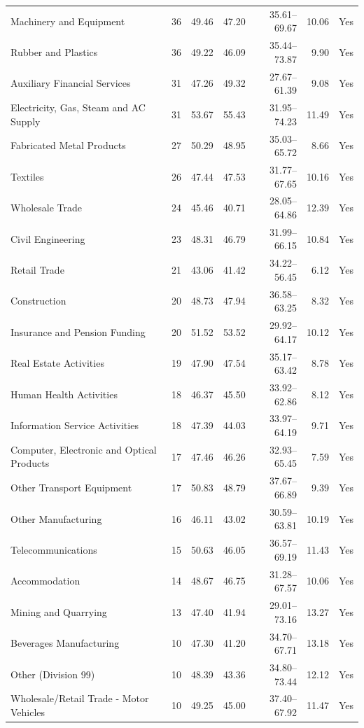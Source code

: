 {\begin{longtable}{@{}L{6.0cm}rrrrrr@{}}
Machinery and Equipment & 36 & 49.46 & 47.20 & 35.61--69.67 & 10.06 & Yes \\
Rubber and Plastics & 36 & 49.22 & 46.09 & 35.44--73.87 & 9.90 & Yes \\
Auxiliary Financial Services & 31 & 47.26 & 49.32 & 27.67--61.39 & 9.08 & Yes \\
Electricity, Gas, Steam and AC Supply & 31 & 53.67 & 55.43 & 31.95--74.23 & 11.49 & Yes \\
Fabricated Metal Products & 27 & 50.29 & 48.95 & 35.03--65.72 & 8.66 & Yes \\
Textiles & 26 & 47.44 & 47.53 & 31.77--67.65 & 10.16 & Yes \\
Wholesale Trade & 24 & 45.46 & 40.71 & 28.05--64.86 & 12.39 & Yes \\
Civil Engineering & 23 & 48.31 & 46.79 & 31.99--66.15 & 10.84 & Yes \\
Retail Trade & 21 & 43.06 & 41.42 & 34.22--56.45 & 6.12 & Yes \\
Construction & 20 & 48.73 & 47.94 & 36.58--63.25 & 8.32 & Yes \\
Insurance and Pension Funding & 20 & 51.52 & 53.52 & 29.92--64.17 & 10.12 & Yes \\
Real Estate Activities & 19 & 47.90 & 47.54 & 35.17--63.42 & 8.78 & Yes \\
Human Health Activities & 18 & 46.37 & 45.50 & 33.92--62.86 & 8.12 & Yes \\
Information Service Activities & 18 & 47.39 & 44.03 & 33.97--64.19 & 9.71 & Yes \\
Computer, Electronic and Optical Products & 17 & 47.46 & 46.26 & 32.93--65.45 & 7.59 & Yes \\
Other Transport Equipment & 17 & 50.83 & 48.79 & 37.67--66.89 & 9.39 & Yes \\
Other Manufacturing & 16 & 46.11 & 43.02 & 30.59--63.81 & 10.19 & Yes \\
Telecommunications & 15 & 50.63 & 46.05 & 36.57--69.19 & 11.43 & Yes \\
Accommodation & 14 & 48.67 & 46.75 & 31.28--67.57 & 10.06 & Yes \\
Mining and Quarrying & 13 & 47.40 & 41.94 & 29.01--73.16 & 13.27 & Yes \\
Beverages Manufacturing & 10 & 47.30 & 41.20 & 34.70--67.71 & 13.18 & Yes \\
Other (Division 99) & 10 & 48.39 & 43.36 & 34.80--73.44 & 12.12 & Yes \\
Wholesale/Retail Trade - Motor Vehicles & 10 & 49.25 & 45.00 & 37.40--67.92 & 11.47 & Yes \\

\end{longtable}}
